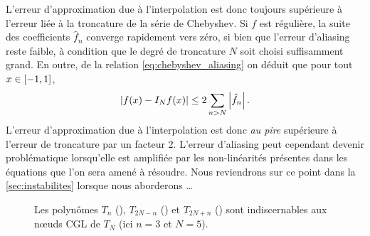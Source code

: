 L'erreur d'approximation due à l'interpolation est donc toujours supérieure à l'erreur liée à la troncature de la série de Chebyshev.
Si $f$ est régulière, la suite des coefficients $\hat{f}_n$ converge rapidement vers zéro, si bien que l'erreur d'aliasing reste faible, à condition que le degré de troncature $N$ soit choisi suffisamment grand.
En outre, de la relation \eqref{eq:chebyshev_aliasing} on déduit que pour tout $x \in \chebinterval$,
\begin{equation}
	\left| f(x) - \interpolant{f}{N}(x) \right| \leq 2 \sum_{n>N} \left| \hat{f}_n \right|.
\end{equation}
L'erreur d'approximation due à l'interpolation est donc \textit{au pire} supérieure à l'erreur de troncature par un facteur 2.
L'erreur d'aliasing peut cependant devenir problématique lorsqu'elle est amplifiée par les non-linéarités présentes dans les équations que l'on sera amené à résoudre. 
Nous reviendrons sur ce point dans la \autoref{sec:instabilites} lorsque nous aborderons \ldots


\begin{figure}
	\centering
	\caption{Les polynômes $T_n$ (\protect{}), $T_{2N - n}$ (\protect{}) et $T_{2N + n}$ (\protect{}) sont indiscernables aux n\oe uds CGL de $T_N$ (ici $n = 3$ et $N = 5$).}
	\label{fig:aliasing_cgl}
\end{figure}


